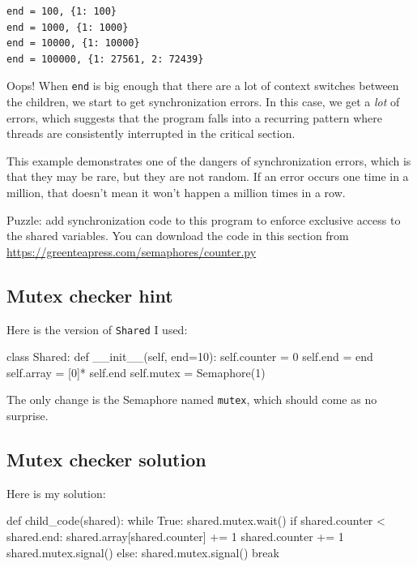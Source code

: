 \documentclass{book}
\begin{document}
\begin{verbatim}
end = 100, {1: 100}
end = 1000, {1: 1000}
end = 10000, {1: 10000}
end = 100000, {1: 27561, 2: 72439}
\end{verbatim}
%
Oops!  When {\tt end} is big enough that there are a lot of
context switches between the children, we start to get synchronization
errors.  In this case, we get a {\em lot} of errors, which suggests
that the program falls into a recurring pattern where threads are
consistently interrupted in the critical section.

This example demonstrates one of the dangers of synchronization
errors, which is that they may be rare, but they are not random.
If an error occurs one time in a million, that doesn't mean it
won't happen a million times in a row.

Puzzle: add synchronization code to this program to enforce
exclusive access to the shared variables.  You can download the
code in this section from \url{https://greenteapress.com/semaphores/counter.py}



\subsection {Mutex checker hint}

Here is the version of {\tt Shared} I used:

\begin{unbreakable}[]{}
class Shared:
    def __init__(self, end=10):
        self.counter = 0
        self.end = end
        self.array = [0]* self.end
        self.mutex = Semaphore(1)
\end{unbreakable}

The only change is the Semaphore named {\tt mutex}, which should
come as no surprise.


\subsection {Mutex checker solution}

Here is my solution:

\begin{unbreakable}[]{}
def child_code(shared):
  while True:
    shared.mutex.wait()
    if shared.counter < shared.end:
      shared.array[shared.counter] += 1
      shared.counter += 1
      shared.mutex.signal()
    else:
      shared.mutex.signal()
      break
\end{unbreakable}
\end{document}
